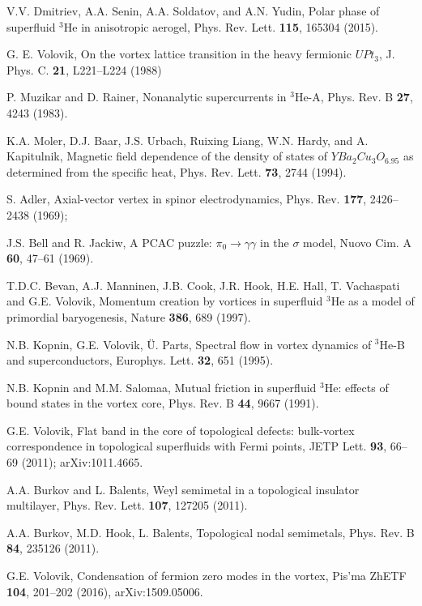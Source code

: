 \documentclass[prb,
superscriptaddress,showpacs,amsmath,amssymb]{revtex4}
\begin{document}
\begin{thebibliography}{99}
V.V. Dmitriev, A.A. Senin, A.A. Soldatov, and A.N. Yudin, 
Polar phase of superfluid $^3$He in anisotropic aerogel,
Phys. Rev. Lett. {\bf 115}, 165304 (2015).

 G. E. Volovik,
On the vortex lattice transition  in the heavy fermionic $UPt_3$,
 J. Phys. C. {\bf 21}, L221--L224 (1988)

P. Muzikar and D. Rainer,
Nonanalytic supercurrents in $^3$He-A,
Phys. Rev. B {\bf 27}, 4243 (1983).

K.A. Moler,  D.J. Baar, J.S. Urbach,  Ruixing Liang, W.N. Hardy, and A. Kapitulnik,
Magnetic field dependence of the density of states of $YBa_2Cu_3O_{6.95}$ as determined from the specific heat,
Phys. Rev. Lett.  {\bf 73},  2744 (1994).

 S. Adler, 
 Axial-vector vertex in spinor electrodynamics,
Phys. Rev. {\bf 177}, 2426--2438 (1969); 

J.S. Bell and R. Jackiw, 
A PCAC puzzle: $\pi_0\rightarrow\gamma\gamma$ in the $\sigma$ model, 
Nuovo Cim. A {\bf 60},  47--61 (1969).

T.D.C. Bevan, A.J. Manninen, J.B. Cook, J.R. Hook, H.E. Hall, T. Vachaspati and G.E. Volovik, 
Momentum creation by vortices in superfluid $^3$He as a model of primordial baryogenesis, 
Nature {\bf 386}, 689 (1997).

N.B. Kopnin, G.E. Volovik, \"U. Parts,
Spectral flow in vortex dynamics of $^3$He-B and superconductors,
 Europhys. Lett. {\bf 32}, 651 (1995).

N.B. Kopnin  and M.M. Salomaa, 
Mutual friction in superfluid $^3$He: effects of bound states in the vortex core, 
Phys. Rev. B {\bf 44}, 9667 (1991).

G.E. Volovik,
Flat band in the core of topological defects: bulk-vortex correspondence in topological superfluids with Fermi points,
 JETP Lett. {\bf 93}, 66--69 (2011);
arXiv:1011.4665.

A.A. Burkov and L. Balents, 
Weyl semimetal in a topological insulator multilayer,
Phys. Rev. Lett. {\bf 107}, 127205 (2011).

A.A. Burkov, M.D. Hook, L. Balents,
Topological nodal semimetals,
Phys. Rev. B {\bf 84}, 235126 (2011).

G.E. Volovik,
Condensation of fermion zero modes in the vortex,
Pis'ma ZhETF {\bf 104},    201--202 (2016),
arXiv:1509.05006.


\end{thebibliography}
\end{document}
